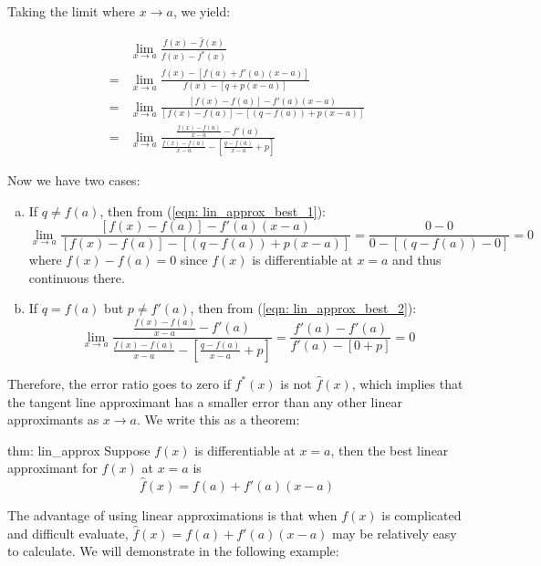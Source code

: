 Taking the limit where $x \rightarrow a$, we yield:

\begin{align}
    &\lim\limits_{x \to a} \frac{f(x)-\hat{f}(x)}{f(x) - f^*(x)} \nonumber \\
    =&\lim\limits_{x \to a} \frac{f(x)-[f(a)+f'(a)(x-a)]}{f(x)-[q+p(x-a)]} \nonumber \\
    =&\lim\limits_{x \to a} \frac{[f(x)-f(a)]-f'(a)(x-a)}{[f(x)-f(a)]-[(q-f(a))+p(x-a)]} \label{eqn: lin_approx_best_1}\\
    =&\lim\limits_{x \to a} \frac{\frac{f(x)-f(a)}{x-a}-f'(a)}{\frac{f(x)-f(a)}{x-a}-\left[\frac{q-f(a)}{x-a}+p\right]}\label{eqn: lin_approx_best_2}
\end{align}

Now we have two cases:

\begin{enumerate}[(a)]
    \item If $q \ne f(a)$, then from (\ref{eqn: lin_approx_best_1}):\\
    \[\lim\limits_{x \to a} \frac{[f(x)-f(a)]-f'(a)(x-a)}{[f(x)-f(a)]-[(q-f(a))+p(x-a)]} = \frac{0-0}{0-[(q-f(a))-0]} = 0\]
    where $f(x)-f(a) = 0$ since $f(x)$ is differentiable at $x=a$ and thus continuous there.
    \item If $q = f(a)$ but $p \ne f'(a)$, then from (\ref{eqn: lin_approx_best_2}):\\
    \[\lim\limits_{x \to a}\frac{\frac{f(x)-f(a)}{x-a}-f'(a)}{\frac{f(x)-f(a)}{x-a}-\left[\frac{q-f(a)}{x-a}+p\right]} = \frac{f'(a)-f'(a)}{f'(a)-[0 + p]} = 0\]
\end{enumerate}

Therefore, the error ratio goes to zero if $f^*(x)$ is not $\hat{f}(x)$, which implies that the tangent line approximant has a smaller error than any other linear approximants as $x \rightarrow a$.  We write this as a theorem:

\pagebreak

\begin{theo}{thm: lin_approx}
    Suppose $f(x)$ is differentiable at $x=a$, then the best linear approximant for $f(x)$ at $x=a$ is
    \[\hat{f}(x) = f(a)+f'(a)(x-a)\]
\end{theo}

The advantage of using linear approximations is that when $f(x)$ is complicated and difficult evaluate, $\hat{f}(x) = f(a) + f'(a)(x-a)$ may be relatively easy to calculate.  We will demonstrate in the following example:


